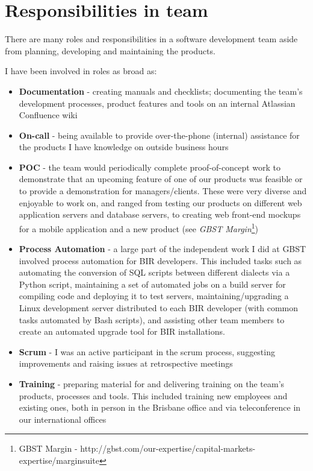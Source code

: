 \section{Responsibilities in team}

There are many roles and responsibilities in a software development team aside from planning, developing and maintaining the products.

I have been involved in roles as broad as:
\begin{itemize}
\item \textbf{Documentation} - creating manuals and checklists; documenting the team's development processes, product features and tools on an internal Atlassian Confluence wiki
\item \textbf{On-call} - being available to provide over-the-phone (internal) assistance for the products I have knowledge on outside business hours
\item \textbf{POC} - the team would periodically complete proof-of-concept work to demonstrate that an upcoming feature of one of our products was feasible or to provide a demonstration for managers/clients. These were very diverse and enjoyable to work on, and ranged from testing our products on different web application servers and database servers, to creating web front-end mockups for a mobile application and a new product (see \textit{GBST Margin\texttrademark}\footnote{GBST Margin - http://gbst.com/our-expertise/capital-markets-expertise/marginsuite})
\item \textbf{Process Automation} - a large part of the independent work I did at GBST involved process automation for BIR developers. This included tasks such as automating the conversion of SQL scripts between different dialects via a Python script, maintaining a set of automated jobs on a build server for compiling code and deploying it to test servers, maintaining/upgrading a Linux development server distributed to each BIR developer (with common tasks automated by Bash scripts), and assisting other team members to create an automated upgrade tool for BIR installations.
\item \textbf{Scrum} - I was an active participant in the scrum process, suggesting improvements and raising issues at retrospective meetings
\item \textbf{Training} - preparing material for and delivering training on the team's products, processes and tools. This included training new employees and existing ones, both in person in the Brisbane office and via teleconference in our international offices
\end{itemize}

